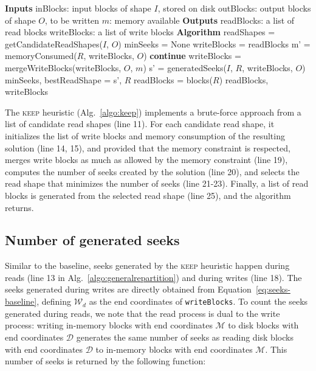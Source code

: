 \documentclass[sigconf, nonacm]{acmart}
\newcommand{\keep}[0]{\textsc{keep}\xspace}
\begin{document}
\begin{algorithm}
  \caption{\keep heuristic (implements \texttt{getReadWriteBlocks})}
  \label{algo:keep}
  \begin{algorithmic}[1]
    \STATE \textbf{Inputs}
    \STATE inBlocks: input blocks of shape $I$, stored on disk
    \STATE outBlocks: output blocks of shape $O$, to be written
    \STATE $m$: memory available
    \STATE
    \STATE \textbf{Outputs}
    \STATE readBlocks: a list of read blocks
    \STATE writeBlocks: a list of write blocks
    \STATE
    \STATE \textbf{Algorithm}
    \STATE readShapes = getCandidateReadShapes($I$, $O$)
    \STATE minSeeks = None
      \STATE writeBlocks = readBlocks
      \STATE m' = memoryConsumed($R$, writeBlocks, $O$)
      \STATE \textbf{continue}
      \ENDIF
      \STATE writeBlocks = mergeWriteBlocks(writeBlocks, $O$, $m$)
      \STATE s' = generatedSeeks($I$, $R$, writeBlocks, $O$)
      \STATE minSeeks, bestReadShape = s', $R$
      \ENDIF
    \ENDFOR
    \STATE readBlocks = blocks($R$)
    \RETURN readBlocks, writeBlocks
  \end{algorithmic}
\end{algorithm}
The \keep heuristic (Alg.~\ref{algo:keep}) implements a brute-force approach
from a list of candidate read shapes (line 11).  
For each candidate read shape, it initializes the list of write blocks and memory consumption of the resulting solution (line
14, 15), and provided that the
memory constraint is respected, merges write blocks as much as allowed by the memory 
constraint (line 19), computes 
the number of seeks created by the solution (line
20), and selects the read shape that minimizes the number of seeks (line
21-23). Finally, a list of read blocks is generated from the  selected read shape (line
25), and the algorithm returns.

\subsection{Number of generated seeks}

Similar to the
baseline, seeks generated by the \keep heuristic happen during reads (line
13 in Alg.~\ref{algo:generalrepartition}) and during writes (line 18). The
seeks generated during writes are directly obtained from
Equation~\ref{eq:seeks-baseline}, defining $\mathcal{W}_d$ as the end coordinates of
\texttt{writeBlocks}. To count the seeks generated
during reads, we note that the read process is dual to the write process:
writing in-memory blocks with end coordinates $\mathcal{M}$ to disk blocks
with end coordinates $\mathcal{D}$ generates the same number of seeks as
reading disk blocks with end coordinates $\mathcal{D}$ to in-memory blocks
with end coordinates $\mathcal{M}$. This number of seeks is returned by the following function:
\end{document}
